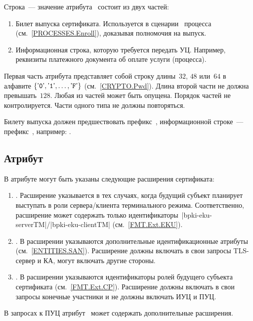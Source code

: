 Строка~--- значение атрибута~ состоит из двух частей:
\begin{enumerate} 
\item
Билет выпуска сертификата. Используется в сценарии~ 
процесса~ (см.~\ref{PROCESSES.Enroll}), 
доказывая полномочия на выпуск.

\item
Информационная строка, которую требуется передать УЦ.
Например, реквизиты платежного документа об оплате услуги (процесса).
\end{enumerate}

Первая часть атрибута представляет собой строку длины~$32$, $48$ или~$64$ 
в алфавите  $\{\texttt{\textsf{'}0\textsf{'}},\texttt{\textsf{'}1\textsf{'}},\ldots,\texttt{\textsf{'}F\textsf{'}}\}$ (см.~\ref{CRYPTO.Pwd}).
Длина второй части не должна превышать~$128$. 
Любая из частей может быть опущена. 
Порядок частей не контролируется.
Части одного типа не должны повторяться.

Билету выпуска должен предшествовать префикс~,
информационной строке~--- префикс~,
например: .

\subsection{Атрибут~}\label{FMT.CSR.ER}

В атрибуте  могут быть указаны следующие 
расширения сертификата:
\begin{enumerate}
\item 
{}. Расширение указывается в тех случаях, когда будущий субъект
планирует выступать в роли сервера/клиента терминального режима. Соответственно,
расширение может содержать только
идентификаторы~\code|bpki-eku-serverTM|/\code|bpki-eku-clientTM|
(см.~\ref{FMT.Ext.EKU}).

\item 
{}. В расширении указываются дополнительные идентификационные
атрибуты (см.~\ref{ENTITIES.SAN}). Расширение должны включать в свои запросы
TLS-сервер и КА, могут включать другие стороны.

\item
{}. В расширении указываются идентификаторы ролей
будущего субъекта сертификата (см.~\ref{FMT.Ext.CP}). Расширение должны включать
в свои запросы конечные участники и не должны включать ИУЦ и ПУЦ.
\end{enumerate}

В запросах к ПУЦ атрибут~ может содержать дополнительные
расширения.
